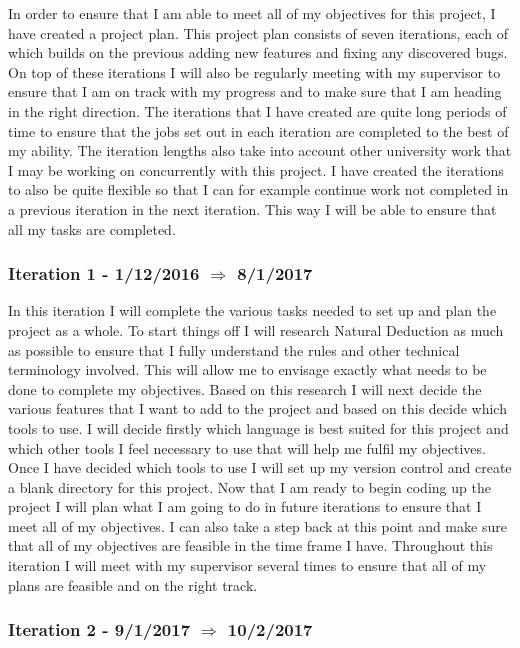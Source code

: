In order to ensure that I am able to meet all of my objectives for this project, I have created a project plan. This project plan consists of seven iterations, each of which builds on the previous adding new features and fixing any discovered bugs. On top of these iterations I will also be regularly meeting with my supervisor to ensure that I am on track with my progress and to make sure that I am heading in the right direction. The iterations that I have created are quite long periods of time to ensure that the jobs set out in each iteration are completed to the best of my ability. The iteration lengths also take into account other university work that I may be working on concurrently with this project. I have created the iterations to also be quite flexible so that I can for example continue work not completed in a previous iteration in the next iteration. This way I will be able to ensure that all my tasks are completed. 


\subsubsection{Iteration 1 - 1/12/2016 $\Rightarrow$ 8/1/2017}

In this iteration I will complete the various tasks needed to set up and plan the project as a whole. To start things off I will research Natural Deduction as much as possible to ensure that I fully understand the rules and other technical terminology involved. This will allow me to envisage exactly what needs to be done to complete my objectives. Based on this research I will next decide the various features that I want to add to the project and based on this decide which tools to use. I will decide firstly which language is best suited for this project and which other tools I feel necessary to use that will help me fulfil my objectives. Once I have decided which tools to use I will set up my version control and create a blank directory for this project. Now that I am ready to begin coding up the project I will plan what I am going to do in future iterations to ensure that I meet all of my objectives. I can also take a step back at this point and make sure that all of my objectives are feasible in the time frame I have. Throughout this iteration I will meet with my supervisor several times to ensure that all of my plans are feasible and on the right track.

\subsubsection{Iteration 2 - 9/1/2017 $\Rightarrow$ 10/2/2017}

